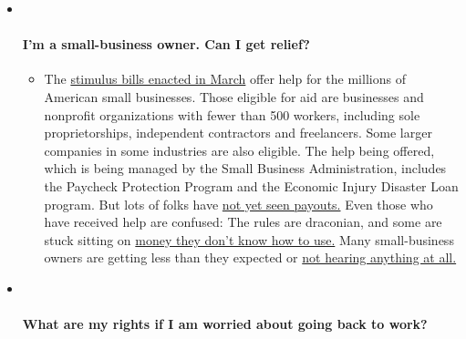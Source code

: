 \begin{itemize}
\item ~
  \hypertarget{im-a-small-business-owner-can-i-get-relief}{%
  \paragraph{I'm a small-business owner. Can I get
  relief?}\label{im-a-small-business-owner-can-i-get-relief}}

  \begin{itemize}
  \tightlist
  \item
    The
    \href{https://www.nytimes3xbfgragh.onion/article/small-business-loans-stimulus-grants-freelancers-coronavirus.html?action=click\&pgtype=Article\&state=default\&region=MAIN_CONTENT_3\&context=storylines_faq}{stimulus
    bills enacted in March} offer help for the millions of American
    small businesses. Those eligible for aid are businesses and
    nonprofit organizations with fewer than 500 workers, including sole
    proprietorships, independent contractors and freelancers. Some
    larger companies in some industries are also eligible. The help
    being offered, which is being managed by the Small Business
    Administration, includes the Paycheck Protection Program and the
    Economic Injury Disaster Loan program. But lots of folks have
    \href{https://www.nytimes3xbfgragh.onion/interactive/2020/05/07/business/small-business-loans-coronavirus.html?action=click\&pgtype=Article\&state=default\&region=MAIN_CONTENT_3\&context=storylines_faq}{not
    yet seen payouts.} Even those who have received help are confused:
    The rules are draconian, and some are stuck sitting on
    \href{https://www.nytimes3xbfgragh.onion/2020/05/02/business/economy/loans-coronavirus-small-business.html?action=click\&pgtype=Article\&state=default\&region=MAIN_CONTENT_3\&context=storylines_faq}{money
    they don't know how to use.} Many small-business owners are getting
    less than they expected or
    \href{https://www.nytimes3xbfgragh.onion/2020/06/10/business/Small-business-loans-ppp.html?action=click\&pgtype=Article\&state=default\&region=MAIN_CONTENT_3\&context=storylines_faq}{not
    hearing anything at all.}
  \end{itemize}
\item ~
  \hypertarget{what-are-my-rights-if-i-am-worried-about-going-back-to-work}{%
  \paragraph{What are my rights if I am worried about going back to
  work?}\label{what-are-my-rights-if-i-am-worried-about-going-back-to-work}}


\end{itemize}
